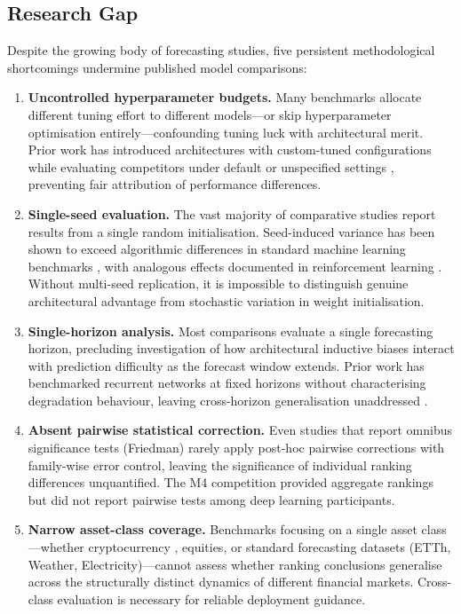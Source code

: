 \subsection{Research Gap}
\label{sec:research_gap}

Despite the growing body of forecasting studies, five persistent methodological shortcomings undermine published model comparisons:

\begin{enumerate}[label=\textbf{G\arabic*.}, leftmargin=1.5cm]
  \item \textbf{Uncontrolled hyperparameter budgets.}  Many benchmarks allocate different tuning effort to different models---or skip hyperparameter optimisation entirely---confounding tuning luck with architectural merit.  Prior work has introduced architectures with custom-tuned configurations while evaluating competitors under default or unspecified settings \citep{Zeng2023, Wu2023timesnet}, preventing fair attribution of performance differences.

  \item \textbf{Single-seed evaluation.}  The vast majority of comparative studies report results from a single random initialisation.  Seed-induced variance has been shown to exceed algorithmic differences in standard machine learning benchmarks \citep{Bouthillier2021}, with analogous effects documented in reinforcement learning \citep{Henderson2018}.  Without multi-seed replication, it is impossible to distinguish genuine architectural advantage from stochastic variation in weight initialisation.

  \item \textbf{Single-horizon analysis.}  Most comparisons evaluate a single forecasting horizon, precluding investigation of how architectural inductive biases interact with prediction difficulty as the forecast window extends.  Prior work has benchmarked recurrent networks at fixed horizons without characterising degradation behaviour, leaving cross-horizon generalisation unaddressed \citep{Hewamalage2021}.

  \item \textbf{Absent pairwise statistical correction.}  Even studies that report omnibus significance tests (\eg Friedman) rarely apply post-hoc pairwise corrections with family-wise error control, leaving the significance of individual ranking differences unquantified.  The M4 competition \citep{Makridakis2018} provided aggregate rankings but did not report pairwise tests among deep learning participants.

  \item \textbf{Narrow asset-class coverage.}  Benchmarks focusing on a single asset class---whether cryptocurrency \citep{Sezer2020}, equities, or standard forecasting datasets (ETTh, Weather, Electricity)---cannot assess whether ranking conclusions generalise across the structurally distinct dynamics of different financial markets.  Cross-class evaluation is necessary for reliable deployment guidance.
\end{enumerate}

